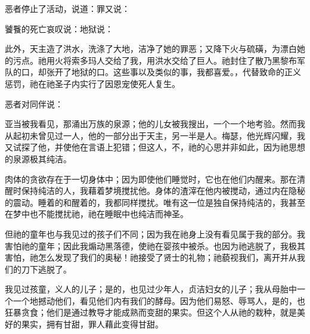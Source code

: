 恶者停止了活动，说道：罪又说：\par

饕餮的死亡哀叹说：地狱说：\par

此外，天主造了洪水，洗涤了大地，洁净了她的罪恶；又降下火与硫磺，为漂白她的污点。祂用火将索多玛人交给了我，用洪水交给了巨人。祂封住了散乃黑黎布军队的口，却张开了地狱的口。这些事以及类似的事，我都喜爱。，代替致命的正义惩罚，祂在祂圣子内实行了因恩宠使死人复生。\par

恶者对同伴说：\par

亚当被我看见，那涌出万族的泉源；他的儿女被我搜出，一个一个地考验。然而我从起初未曾见过一人，他的一部分出于天主，另一半是人。梅瑟，他光辉闪耀，我又试探了他，并使他在言语上犯错；但这人，不，祂的心思并非如此，因为祂思想的泉源极其纯洁。\par

肉体的贪欲存在于一切身体中；因为即使他们睡觉时，它也在他们内醒来。那在清醒时保持纯洁的人，我藉着梦境搅扰他。身体的渣滓在他内被搅动，通过内在隐秘的震动。睡着的和醒着的，我都同样搅扰。唯有这一位是独自保持纯洁的，我甚至在梦中也不能搅扰祂，祂在睡眠中也纯洁而神圣。\par

但祂的童年也与我见过的孩子们不同；因为我在祂身上没有看见属于我的部分。我害怕祂的童年；因此我煽动黑落德，使祂在婴孩中被杀。也因为祂逃脱了，我极其害怕，祂怎么发现了我们的奥秘！祂接受了贤士的礼物；祂藐视我们，离开并从我们的刀下逃脱了。\par

我见过孩童，义人的儿子；是的，也见过少年人，贞洁妇女的儿子；我从母胎中一个一个地撼动他们，看见他们内有我们的酵母。因为他们易怒、辱骂人，是的，也狂暴贪食；他们是通过教导才能成熟而变甜的果实。但这个人从祂的栽种，就是美好的果实，拥有甘甜，罪人藉此变得甘甜。\par

